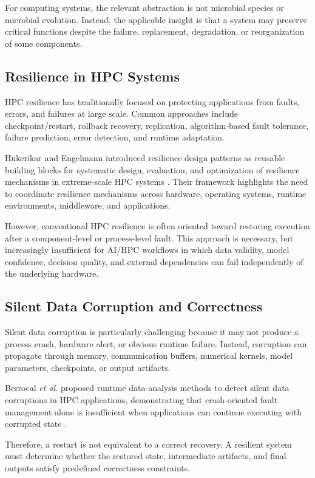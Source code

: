 \documentclass[conference]{IEEEtran}
\begin{document}
For computing systems, the relevant abstraction is not microbial species or microbial evolution. Instead, the applicable insight is that a system may preserve critical functions despite the failure, replacement, degradation, or reorganization of some components.

\subsection{Resilience in HPC Systems}

HPC resilience has traditionally focused on protecting applications from faults, errors, and failures at large scale. Common approaches include checkpoint/restart, rollback recovery, replication, algorithm-based fault tolerance, failure prediction, error detection, and runtime adaptation.

Hukerikar and Engelmann introduced resilience design patterns as reusable building blocks for systematic design, evaluation, and optimization of resilience mechanisms in extreme-scale HPC systems \cite{hukerikar2017}. Their framework highlights the need to coordinate resilience mechanisms across hardware, operating systems, runtime environments, middleware, and applications.

However, conventional HPC resilience is often oriented toward restoring execution after a component-level or process-level fault. This approach is necessary, but increasingly insufficient for AI/HPC workflows in which data validity, model confidence, decision quality, and external dependencies can fail independently of the underlying hardware.

\subsection{Silent Data Corruption and Correctness}

Silent data corruption is particularly challenging because it may not produce a process crash, hardware alert, or obvious runtime failure. Instead, corruption can propagate through memory, communication buffers, numerical kernels, model parameters, checkpoints, or output artifacts.

Berrocal \emph{et al.} proposed runtime data-analysis methods to detect silent data corruptions in HPC applications, demonstrating that crash-oriented fault management alone is insufficient when applications can continue executing with corrupted state \cite{berrocal2015}.

Therefore, a restart is not equivalent to a correct recovery. A resilient system must determine whether the restored state, intermediate artifacts, and final outputs satisfy predefined correctness constraints.
\end{document}
